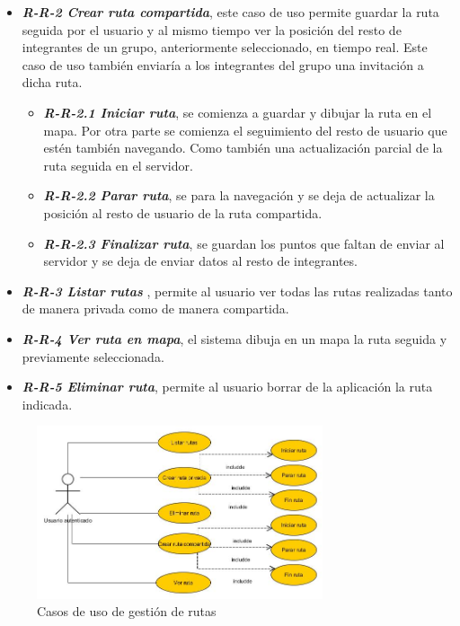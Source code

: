\begin{itemize}
\begin{itemize}
\item \textbf{\textit{R-R-2 Crear ruta compartida}}, este caso de uso permite guardar la ruta seguida por el usuario y al mismo tiempo ver la posición del resto de integrantes de un grupo, anteriormente seleccionado, en tiempo real. Este caso de uso también enviaría a los integrantes del grupo una invitación a dicha ruta.
\begin{itemize}
\item \textbf{\textit{R-R-2.1 Iniciar ruta}}, se comienza a guardar y dibujar la ruta en el mapa. Por otra parte se comienza el seguimiento del resto de usuario que estén también navegando. Como también una actualización parcial de la ruta seguida en el servidor.
\item \textbf{\textit{R-R-2.2 Parar ruta}}, se para la navegación y se deja de actualizar la posición al resto de usuario de la ruta compartida.
\item \textbf{\textit{R-R-2.3 Finalizar ruta}}, se guardan los puntos que faltan de enviar al servidor y se deja de enviar datos al resto de integrantes.
\end{itemize}
\item \textbf{\textit{R-R-3 Listar rutas} }, permite al usuario ver todas las rutas realizadas tanto de manera privada como de manera compartida.
\item \textbf{\textit{R-R-4 Ver ruta en mapa}}, el sistema dibuja en un mapa la ruta seguida y previamente seleccionada.
\item \textbf{\textit{R-R-5 Eliminar ruta}}, permite al usuario borrar de la aplicación la ruta indicada.

\end{itemize} 
\end{itemize}
\begin{figure}[H]
		\centering
		\includegraphics[width=0.75\textwidth] {rutas.jpg}
		\caption{Casos de uso de gestión de rutas }
	\end{figure}


